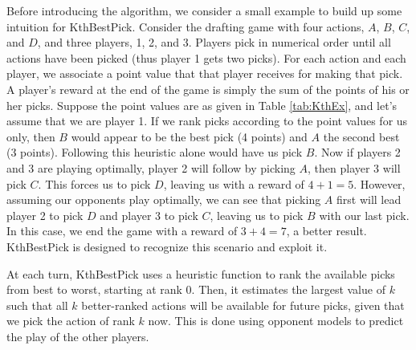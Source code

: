 \documentclass[letterpaper]{article}
\numberwithin{equation}{section}
\numberwithin{theorem}{section}
\numberwithin{lemma}{section}
\numberwithin{df}{section}
\begin{document}


Before introducing the algorithm, we consider a small example to build up some intuition for KthBestPick.  Consider the drafting game with four actions, $A$, $B$, $C$, and $D$, and three players, 1, 2, and 3.  Players pick in numerical order until all actions have been picked (thus player 1 gets two picks).  For each action and each player, we associate a point value that that player receives for making that pick.  A player's reward at the end of the game is simply the sum of the points of his or her picks.  Suppose the point values are as given in Table \ref{tab:KthEx}, and let's assume that we are player 1.  If we rank picks according to the point values for us only, then $B$ would appear to be the best pick (4 points) and $A$ the second best (3 points).  Following this heuristic alone would have us pick $B$.  Now if players 2 and 3 are playing optimally, player 2 will follow by picking $A$, then player 3 will pick $C$.  This forces us to pick $D$, leaving us with a reward of $4 + 1 = 5$.  However, assuming our opponents play optimally, we can see that picking $A$ first will lead player 2 to pick $D$ and player 3 to pick $C$, leaving us to pick $B$ with our last pick.  In this case, we end the game with a reward of $3 + 4 = 7$, a better result.  KthBestPick is designed to recognize this scenario and exploit it.

At each turn, KthBestPick uses a heuristic function to rank the available picks from best to worst, starting at rank 0.  Then, it estimates the largest value of $k$ such that all $k$ better-ranked actions will be available for future picks, given that we pick the action of rank $k$ now.  This is done using opponent models to predict the play of the other players. %
\end{document}
